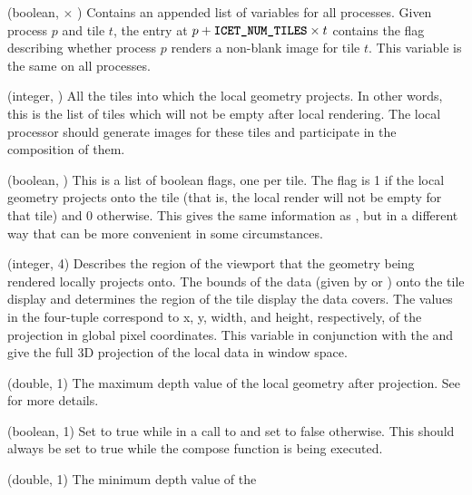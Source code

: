 \begin{Description}[xxxxxxxx]
\item[\CEnum{ICET\_ALL\_CONTAINED\_TILES\_MASKS}] (boolean,
   $\times$ ) Contains
  an appended list of  variables for
  all processes.  Given process $p$ and tile $t$, the entry at
  $p+\CEnum{ICET\_NUM\_TILES} \times t$ contains the flag describing
  whether process $p$ renders a non-blank image for tile $t$.  This
  variable is the same on all processes.
\item[\CEnum{ICET\_CONTAINED\_TILES\_LIST}] (integer,
  ) All the tiles into which the local
  geometry projects.  In other words, this is the list of tiles which will
  not be empty after local rendering.  The local processor should generate
  images for these tiles and participate in the composition of them.
\item[\CEnum{ICET\_CONTAINED\_TILES\_MASK}] (boolean,
  ) This is a list of boolean flags, one per tile.
  The flag is 1 if the local geometry projects onto the tile (that is, the
  local render will not be empty for that tile) and 0 otherwise.  This
  gives the same information as , but
  in a different way that can be more convenient in some circumstances.
\item[\CEnum{ICET\_CONTAINED\_VIEWPORT}] (integer, 4) Describes the region
  of the viewport that the geometry being rendered locally projects onto.
  The bounds of the data (given by  or
  ) onto the tile display and determines the
  region of the tile display the data covers.  The values in the four-tuple
  correspond to x, y, width, and height, respectively, of the projection in
  global pixel coordinates.  This variable in conjunction with the
   and  give the full 3D
  projection of the local data in window space.
\item[\CEnum{ICET\_FAR\_DEPTH}] (double, 1) The maximum depth value of the
  local geometry after projection.  See 
  for more details.
\item[\CEnum{ICET\_IS\_DRAWING\_FRAME}] (boolean, 1) Set to true while in a
  call to  and set to false otherwise.  This should
  always be set to true while the compose function is being executed.
\item[\CEnum{ICET\_NEAR\_DEPTH}] (double, 1) The minimum depth value of the

\end{Description}
